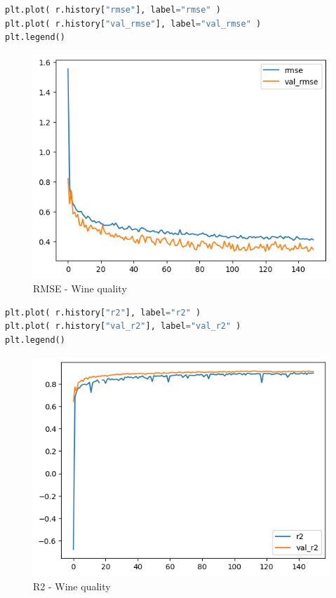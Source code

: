 \begin{lstlisting}[language=Python, style=input]
plt.plot( r.history["rmse"], label="rmse" )
plt.plot( r.history["val_rmse"], label="val_rmse" )
plt.legend()
\end{lstlisting}
\begin{figure}[H]
\centering
\includegraphics[width=.8\linewidth]{apendices/fig/13_IAA012_7.png}
\caption{RMSE - Wine quality}
\end{figure}

\begin{lstlisting}[language=Python, style=input]
plt.plot( r.history["r2"], label="r2" )
plt.plot( r.history["val_r2"], label="val_r2" )
plt.legend()
\end{lstlisting}
\begin{figure}[H]
\centering
\includegraphics[width=.8\linewidth]{apendices/fig/13_IAA012_8.png}
\caption{R2 - Wine quality}
\end{figure}
